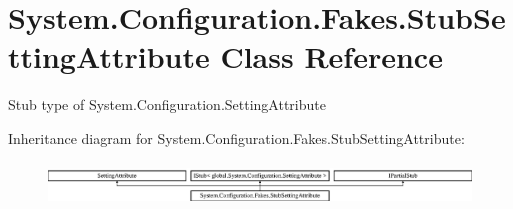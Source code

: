 \hypertarget{class_system_1_1_configuration_1_1_fakes_1_1_stub_setting_attribute}{\section{System.\-Configuration.\-Fakes.\-Stub\-Setting\-Attribute Class Reference}
\label{class_system_1_1_configuration_1_1_fakes_1_1_stub_setting_attribute}
}


Stub type of System.\-Configuration.\-Setting\-Attribute 


Inheritance diagram for System.\-Configuration.\-Fakes.\-Stub\-Setting\-Attribute\-:\begin{figure}[H]
\begin{center}
\leavevmode
\includegraphics[height=1.170324cm]{class_system_1_1_configuration_1_1_fakes_1_1_stub_setting_attribute}
\end{center}
\end{figure}
